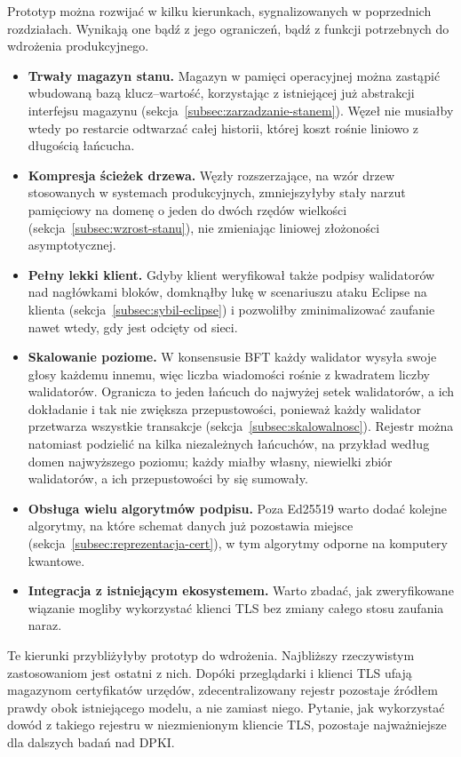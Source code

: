 Prototyp można rozwijać w kilku kierunkach, sygnalizowanych w poprzednich rozdziałach. Wynikają one bądź z jego ograniczeń, bądź z funkcji potrzebnych do wdrożenia produkcyjnego.

\begin{itemize}
    \item \textbf{Trwały magazyn stanu.} Magazyn w pamięci operacyjnej można zastąpić wbudowaną bazą klucz--wartość, korzystając z istniejącej już abstrakcji interfejsu magazynu (sekcja~\ref{subsec:zarzadzanie-stanem}). Węzeł nie musiałby wtedy po restarcie odtwarzać całej historii, której koszt rośnie liniowo z długością łańcucha.
    \item \textbf{Kompresja ścieżek drzewa.} Węzły rozszerzające, na wzór drzew stosowanych w systemach produkcyjnych, zmniejszyłyby stały narzut pamięciowy na domenę o jeden do dwóch rzędów wielkości (sekcja~\ref{subsec:wzrost-stanu}), nie zmieniając liniowej złożoności asymptotycznej.
    \item \textbf{Pełny lekki klient.} Gdyby klient weryfikował także podpisy walidatorów nad nagłówkami bloków, domknąłby lukę w scenariuszu ataku Eclipse na klienta (sekcja~\ref{subsec:sybil-eclipse}) i pozwoliłby zminimalizować zaufanie nawet wtedy, gdy jest odcięty od sieci.
    \item \textbf{Skalowanie poziome.} W konsensusie BFT każdy walidator wysyła swoje głosy każdemu innemu, więc liczba wiadomości rośnie z kwadratem liczby walidatorów. Ogranicza to jeden łańcuch do najwyżej setek walidatorów, a ich dokładanie i tak nie zwiększa przepustowości, ponieważ każdy walidator przetwarza wszystkie transakcje (sekcja~\ref{subsec:skalowalnosc}). Rejestr można natomiast podzielić na kilka niezależnych łańcuchów, na przykład według domen najwyższego poziomu; każdy miałby własny, niewielki zbiór walidatorów, a ich przepustowości by się sumowały.
    \item \textbf{Obsługa wielu algorytmów podpisu.} Poza Ed25519 warto dodać kolejne algorytmy, na które schemat danych już pozostawia miejsce (sekcja~\ref{subsec:reprezentacja-cert}), w tym algorytmy odporne na komputery kwantowe.
    \item \textbf{Integracja z istniejącym ekosystemem.} Warto zbadać, jak zweryfikowane wiązanie mogliby wykorzystać klienci TLS bez zmiany całego stosu zaufania naraz.
\end{itemize}

Te kierunki przybliżyłyby prototyp do wdrożenia. Najbliższy rzeczywistym zastosowaniom jest ostatni z nich. Dopóki przeglądarki i klienci TLS ufają magazynom certyfikatów urzędów, zdecentralizowany rejestr pozostaje źródłem prawdy obok istniejącego modelu, a nie zamiast niego. Pytanie, jak wykorzystać dowód z takiego rejestru w niezmienionym kliencie TLS, pozostaje najważniejsze dla dalszych badań nad DPKI.
